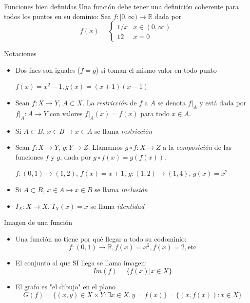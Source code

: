 \documentclass[14pt,aspectratio=169,xcolor=dvipsnames]{beamer}
\begin{document}
\begin{frame}{Funciones bien definidas}
    Una función debe tener una definición coherente para todos los puntos en su dominio: Sea $f:[0,\infty) \to \mathbb R$ dada por
    $$ f(x) = 
    \begin{cases}
        1/x & x\in (0,\infty) \\
        12  & x = 0
    \end{cases}
    $$
\end{frame}
\begin{frame}{Notaciones}
    \begin{small}
    \begin{itemize}
            \item<+-> Dos fnes son iguales ($f=g$) si toman el mismo valor en todo punto 
                \begin{flushright}
                    $f(x) = x^2-1, g(x) = (x+1)(x-1)$
                \end{flushright}
            \item<+-> Sean $f:X\to Y$, $A\subset X$. La \emph{restricción} de $f$ a $A$ se denota $f|_A$ y está dada por $f|_A:A\to Y$ con valores $f|_A(x)=f(x)$ para todo $x \in A$. 
            \item<+-> Si $A\subset B$, $x\in B\mapsto x\in A$ se llama \emph{restricción}
            \item<+-> Sean $f:X\to Y$, $g:Y\to Z$. Llamamos $g\circ f:X\to Z$ a la \emph{composición} de las funciones $f$ y $g$, dada por $g\circ f(x) = g(f(x))$. 
                \begin{flushright}
                    $f:(0,1)\to (1,2)$, $f(x) = x+1$, $g:(1,2)\to (1,4)$, $g(x) = x^2$
                \end{flushright}
            \item<+-> Si $A\subset B$, $x\in A\mapsto x\in B$ se llama \emph{inclusión}
            \item<+-> $I_X:X \to X$, $I_X(x) = x$ se llama \emph{identidad}
        \end{itemize}
    \end{small}
\end{frame}
\begin{frame}{Imagen de una función}
    \begin{itemize}
        \item Una función no tiene por qué llegar a todo su codominio:
            $$f:(0,1)\to \mathbb R, f(x) = x^2, f(x) = 2, \text{etc}$$
        \item El conjunto al que SI llega se llama imagen:
            $$ Im(f) = \{ f(x) | x \in X \} $$
        \item El grafo es "el dibujo" en el plano
            $$ G(f) = \{(x,y) \in X\times Y: \exists x \in X, y = f(x)\} = \{(x, f(x)): x\in X \}$$
    \end{itemize}
\end{frame}
\end{document}
